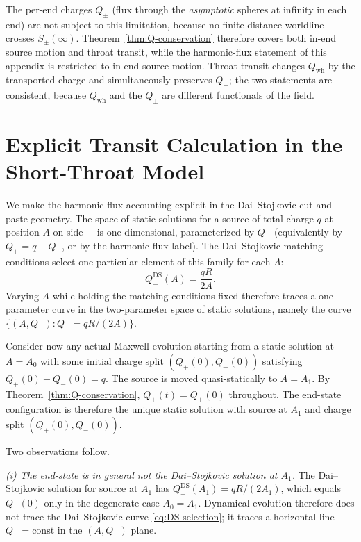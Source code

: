 \documentclass[aps,prd,onecolumn,nofootinbib,superscriptaddress]{revtex4-2}
\begin{document}
The per-end charges $Q_\pm$ (flux through the \emph{asymptotic} spheres at infinity in each end) are not subject to this limitation, because no finite-distance worldline crosses $S_\pm(\infty)$. Theorem~\ref{thm:Q-conservation} therefore covers both in-end source motion and throat transit, while the harmonic-flux statement of this appendix is restricted to in-end source motion. Throat transit changes $Q_{\mathrm{wh}}$ by the transported charge and simultaneously preserves $Q_\pm$; the two statements are consistent, because $Q_{\mathrm{wh}}$ and the $Q_\pm$ are different functionals of the field.

\section{Explicit Transit Calculation in the Short-Throat Model}
\label{app:transit}

We make the harmonic-flux accounting explicit in the Dai--Stojkovic cut-and-paste geometry. The space of static solutions for a source of total charge $q$ at position $A$ on side $+$ is one-dimensional, parameterized by $Q_-$ (equivalently by $Q_+ = q - Q_-$, or by the harmonic-flux label). The Dai--Stojkovic matching conditions select one particular element of this family for each $A$:
\begin{equation}
\label{eq:DS-selection}
Q_-^{\mathrm{DS}}(A) = \frac{qR}{2A}.
\end{equation}
Varying $A$ while holding the matching conditions fixed therefore traces a one-parameter curve in the two-parameter space of static solutions, namely the curve $\{(A, Q_-) : Q_- = qR/(2A)\}$.

Consider now any actual Maxwell evolution starting from a static solution at $A=A_0$ with some initial charge split $(Q_+(0),Q_-(0))$ satisfying $Q_+(0)+Q_-(0)=q$. The source is moved quasi-statically to $A=A_1$. By Theorem~\ref{thm:Q-conservation}, $Q_\pm(t)=Q_\pm(0)$ throughout. The end-state configuration is therefore the unique static solution with source at $A_1$ and charge split $(Q_+(0),Q_-(0))$.

Two observations follow.

\emph{(i) The end-state is in general not the Dai--Stojkovic solution at $A_1$.} The Dai--Stojkovic solution for source at $A_1$ has $Q_-^{\mathrm{DS}}(A_1) = qR/(2A_1)$, which equals $Q_-(0)$ only in the degenerate case $A_0=A_1$. Dynamical evolution therefore does not trace the Dai--Stojkovic curve \eqref{eq:DS-selection}; it traces a horizontal line $Q_- = \mathrm{const}$ in the $(A,Q_-)$ plane.
\end{document}

